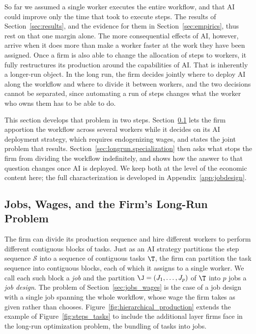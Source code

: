 So far we assumed a single worker executes the entire workflow, and that AI could improve only the time that took to execute steps. 
The results of Section~\ref{sec:results}, and the evidence for them in Section~\ref{sec:empirics}, thus rest on that one margin alone.
The more consequential effects of AI, however, arrive when it does more than make a worker faster at the work they have been assigned.
Once a firm is also able to change the allocation of steps to workers, it fully restructures its production around the capabilities of AI.
That is inherently a longer-run object. 
In the long run, the firm decides jointly where to deploy AI along the workflow and where to divide it between workers, and the two decisions cannot be separated, since automating a run of steps changes what the worker who owns them has to be able to do.

This section develops that problem in two steps.
Section~\ref{sec:longrun.jobdesign} lets the firm apportion the workflow across several workers while it decides on its AI deployment strategy, which requires endogenizing wages, and states the joint problem that results.
Section~\ref{sec:longrun.specialization} then asks what stops the firm from dividing the workflow indefinitely, and shows how the answer to that question changes once AI is deployed.
We keep both at the level of the economic content here; the full characterization is developed in Appendix~\ref{app:jobdesign}.


\subsection{Jobs, Wages, and the Firm's Long-Run Problem}
\label{sec:longrun.jobdesign}

The firm can divide its production sequence and hire different workers to perform different contiguous blocks of tasks.
Just as an AI strategy partitions the step sequence $\mathcal{S}$ into a sequence of contiguous tasks $\T$, the firm can partition the task sequence into contiguous blocks, each of which it assigns to a single worker.
We call each such block a \emph{job} and the partition $\J = (J_1, \dotsc, J_p)$ of $\T$ into $p$ jobs a \emph{job design}.
The problem of Section~\ref{sec:jobs_wages} is the case of a job design with a single job spanning the whole workflow, whose wage the firm takes as given rather than chooses.
Figure~\ref{fig:hierarchical_production} extends the example of Figure~\ref{fig:steps_tasks} to include the additional layer firms face in the long-run optimization problem, the bundling of tasks into jobs.


